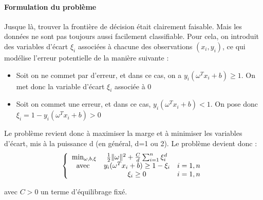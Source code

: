 \paragraph{Formulation du problème\\}
Jusque là, trouver la frontière de décision était clairement faisable. Mais les données ne sont pas toujours aussi facilement classifiable. Pour cela, on introduit des variables d'écart $\xi_i$ associées à chacune des observations $(x_i,y_i)$, ce qui modélise l'erreur potentielle de la manière suivante :

\begin{itemize}
	\item Soit on ne commet par d'erreur, et dans ce cas, on a $y_i(\omega^Tx_i+b)\geq 1$. On met donc la variable d'écart $\xi_i$ associée à 0
	\item Soit on commet une erreur, et dans ce cas, $y_i(\omega^Tx_i+b)<1$. On pose donc $\xi_i=1-y_i(\omega^Tx_i+b)>0$
\end{itemize} 

Le problème revient donc à maximiser la marge et à minimiser les variables d'écart, mis à la puissance d (en général, d=1 ou 2). Le problème devient donc :
	\[\left\{\begin{array}{c c c}
	\min_{\omega, b, \xi} & \frac{1}{2} \|\omega\|^2 +\frac{C}{d} \sum_{i=1}^n \xi_i^d &\\
	\text{avec } & y_i(\omega^Tx_i+b)\geq 1-\xi_i & i=1,n\\
		& \xi_i\geq 0 & i=1,n
	\end{array}\right.\]

avec $C>0$ un terme d'équilibrage fixé.

